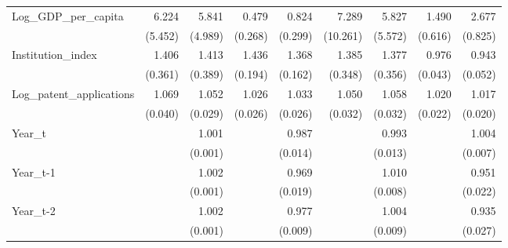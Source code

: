 \begin{table}[htbp]
\begin{tabular}{l*{8}{D{.}{.}{-1}}}
Log\_GDP\_per\_capita&       6.224\sym{**} &       5.841\sym{**} &       0.479         &       0.824         &       7.289         &       5.827\sym{*}  &       1.490         &       2.677\sym{***}\\
            &     (5.452)         &     (4.989)         &     (0.268)         &     (0.299)         &    (10.261)         &     (5.572)         &     (0.616)         &     (0.825)         \\
Institution\_index&       1.406         &       1.413         &       1.436\sym{***}&       1.368\sym{***}&       1.385         &       1.377         &       0.976         &       0.943         \\
            &     (0.361)         &     (0.389)         &     (0.194)         &     (0.162)         &     (0.348)         &     (0.356)         &     (0.043)         &     (0.052)         \\
Log\_patent\_applications&       1.069\sym{*}  &       1.052\sym{*}  &       1.026         &       1.033         &       1.050         &       1.058\sym{*}  &       1.020         &       1.017         \\
            &     (0.040)         &     (0.029)         &     (0.026)         &     (0.026)         &     (0.032)         &     (0.032)         &     (0.022)         &     (0.020)         \\
Year\_t      &                     &       1.001         &                     &       0.987         &                     &       0.993         &                     &       1.004         \\
            &                     &     (0.001)         &                     &     (0.014)         &                     &     (0.013)         &                     &     (0.007)         \\
Year\_t-1    &                     &       1.002         &                     &       0.969         &                     &       1.010         &                     &       0.951\sym{**} \\
            &                     &     (0.001)         &                     &     (0.019)         &                     &     (0.008)         &                     &     (0.022)         \\
Year\_t-2    &                     &       1.002\sym{**} &                     &       0.977\sym{**} &                     &       1.004         &                     &       0.935\sym{**} \\
            &                     &     (0.001)         &                     &     (0.009)         &                     &     (0.009)         &                     &     (0.027)         \\

\end{tabular}
\end{table}
